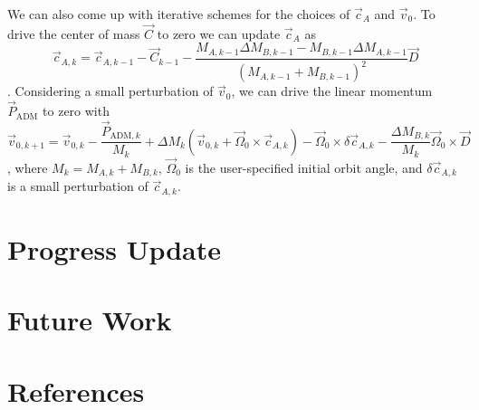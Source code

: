 \documentclass{../document}
\begin{document}
  We can also come up with iterative schemes for the choices of $\vec c_A$ and $\vec v_0$. To drive the center of mass $\vec C$ to zero we can update $\vec c_A$ as
  \begin{equation}
		\vec c_{A,k} = \vec c_{A,k-1} - \vec C_{k-1} - \frac{M_{A,k-1}  \Delta M_{B,k-1} - M_{B,k-1} \Delta M_{A,k-1}}{(M_{A,k-1} + M_{B,k-1})^2} \vec D
  \end{equation}
  \cite{Serguei}. Considering a small perturbation of $\vec v_0$, we can drive the linear momentum $\vec P_\text{ADM}$ to zero with
  \begin{equation}
    \vec v_{0,k+1} = \vec v_{0,k} - \frac{\vec P_{\text{ADM},k}}{M_k} + \Delta M_k (\vec v_{0,k} + \vec\Omega_0 \times \vec c_{A,k}) - \vec\Omega_0 \times \delta \vec c_{A,k} - \frac{\Delta M_{B,k}}{M_k} \vec\Omega_0 \times \vec D
  \end{equation}
	\cite{Serguei}, where $M_k = M_{A,k} + M_{B,k}$, $\vec \Omega_0$ is the user-specified initial orbit angle, and $\delta \vec c_{A,k}$ is a small perturbation of $\vec c_{A,k}$.

	\section{Progress Update}

	\section{Future Work}

	\section*{References}

	\printbibliography[heading=none]
\end{document}
